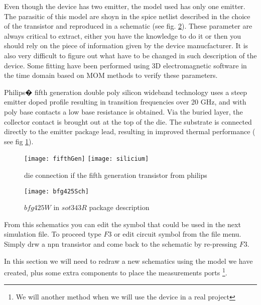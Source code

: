 Even though the device has two emitter, the model used has only one emitter. The parasitic of this model are shoyn in the spice netlist described in the choice of the transistor and reproduced in a schematic (see fig. \ref{design:pa:model:parasitSch}). These parameter are always critical to extract, either you have the knowledge to do it or then you should rely on the piece of information given by the device manucfacturer. It is also very difficult to figure out what have to be changed in such description of the device. Some fitting have been performed using 3D electromagnetic software in the time domain based on MOM methods to verify these parameters.

Philips�  fifth  generation double poly silicon wideband technology uses a steep emitter doped profile resulting in transition frequencies over 20 GHz, and with poly base contacts a low base resistance is obtained. Via the buried layer, the collector contact is brought out at the top of the die. The substrate is connected directly to the emitter package lead, resulting in improved thermal performance ( see fig \ref{design:pa:model:fifthGen}).

\begin{figure}[htbp]
\begin{center}
	\texttt{[image: fifthGen]}
	\texttt{[image: silicium]}
	\caption{die connection if the fifth generation transistor from philips}
	\label{design:pa:model:fifthGen}
\end{center}
\end{figure}


\begin{figure}[htbp]
\begin{center}
	\texttt{[image: bfg425Sch]}
	\caption{$bfg425W$ in $sot343R$ package description}
	\label{design:pa:model:parasitSch}
\end{center}
\end{figure}

From this schematics you can edit the symbol that could be used in the next simulation file. To proceed type $F3$ or edit circuit symbol from the file menu. Simply drw a npn transistor and come back to the schematic by re-pressing $F3$.


In this section we will need to redraw a new schematics using the model we have created, plus some extra components to place the measurements ports \footnote{We will another method when we will use the device in a real project}.

